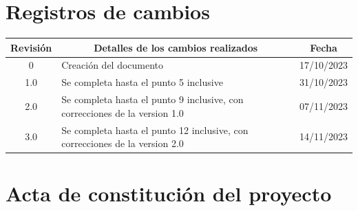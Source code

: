 \documentclass[
11pt, %
]{charter}
\begin{document}
\maketitle
\thispagestyle{empty}
\pagebreak


\thispagestyle{empty}
{\setlength{\parskip}{0pt}
\tableofcontents{}
}
\pagebreak


\section*{Registros de cambios}
\label{sec:registro}


\begin{table}[ht]
\label{tab:registro}
\centering
\begin{tabularx}{\linewidth}{@{}|c|X|c|@{}}
\hline
\rowcolor[HTML]{C0C0C0} 
Revisión & \multicolumn{1}{c|}{\cellcolor[HTML]{C0C0C0}Detalles de los cambios realizados} & Fecha      \\ \hline
 0      & Creación del documento                                 & 17/10/2023 \\ \hline
1.0      & Se completa hasta el punto 5 inclusive                & 31/10/2023 \\ \hline
2.0      & Se completa hasta el punto 9 inclusive, con correcciones de la version 1.0               & 07/11/2023 \\ \hline
3.0      & Se completa hasta el punto 12 inclusive, con correcciones de la version 2.0               & 14/11/2023 \\ \hline
\end{tabularx}
\end{table}

\pagebreak



\section*{Acta de constitución del proyecto}
\label{sec:acta}
\end{document}
